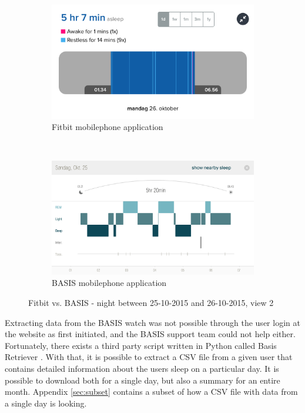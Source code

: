 \documentclass[12pt]{article} %
\begin{document}
\begin{figure}[H]
    \centering
    \begin{subfigure}[b]{0.45\textwidth}
        \includegraphics[width=\textwidth]{img/26-10-fitbit1}
        \caption{Fitbit mobilephone application}
        \label{fig:fitbit2}
    \end{subfigure}
    ~ %
    \begin{subfigure}[b]{0.45\textwidth}
        \includegraphics[width=\textwidth]{img/26-10-basis1}
        \caption{BASIS mobilephone application}
        \label{fig:basis2}
    \end{subfigure}
    \caption{Fitbit vs. BASIS - night between 25-10-2015 and 26-10-2015, view 2}
    \label{fig:pilot2}
\end{figure}

Extracting data from the BASIS watch was not possible through the user login at the website as first initiated, and the BASIS support team could not help either. Fortunately, there exists a third party script written in Python called Basis Retriever \cite{basis_retriever}. With that, it is possible to extract a CSV file from a given user that contains detailed information about the users sleep on a particular day. It is possible to download both for a single day, but also a summary for an entire month. Appendix \ref{sec:subset} contains a subset of how a CSV file with data from a single day is looking. \\
\end{document}
